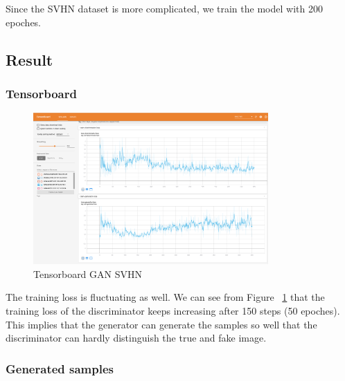 \documentclass{article}
\begin{document}
Since the SVHN dataset is more complicated, we train the model with 200 epoches.

\subsection{Result}

\subsubsection{Tensorboard}

\begin{figure}[!htb]
  \centering
  \includegraphics[width=0.8\textwidth]{tensorboard-GAN-SVHN.png}
  \caption{Tensorboard GAN SVHN}
  \label{fig:TB_GAN_SVHN}
\end{figure}

The training loss is fluctuating as well. We can see from Figure ~\ref{fig:TB_GAN_SVHN} that the training loss of the discriminator keeps increasing after 150 steps (50 epoches). This implies that the generator can generate the samples so well that the discriminator can hardly distinguish the true and fake image.

\subsubsection{Generated samples}
\end{document}
